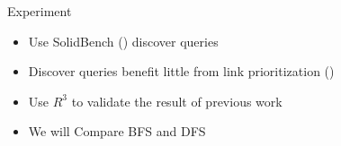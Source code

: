 \begin{frame}{Experiment}
    \begin{itemize}
        \item Use SolidBench (\textcite{taelman2023link}) discover queries
        \item Discover queries benefit little from link prioritization (\textcite{eschauzier2023does})
        \item Use $ R^{3} $ to validate the result of previous work
        \item We will Compare BFS and DFS 
    \end{itemize}
\end{frame}